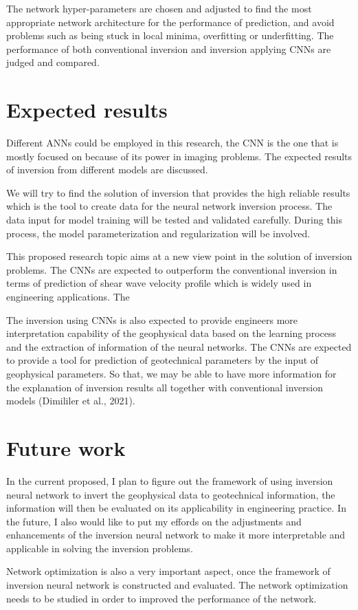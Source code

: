 The network hyper-parameters are chosen and adjusted to find the most appropriate network architecture for the performance of prediction, and avoid problems such as being stuck in local minima, overfitting or underfitting. The performance of both conventional inversion and inversion applying CNNs are judged and compared. 

\section*{Expected results}

Different ANNs could be employed in this research, the CNN is the one that is mostly focused on because of its power in imaging problems. The expected results of inversion from different models are discussed.

We will try to find the solution of inversion that provides the high reliable results which is the tool to create data for the neural network inversion process. The data input for model training will be tested and validated carefully. During this process, the model parameterization and regularization will be involved.

This proposed research topic aims at a new view point in the solution of inversion problems. The CNNs are expected to outperform the conventional inversion in terms of prediction of shear wave velocity profile which is widely used in engineering applications. The  

The inversion using CNNs is also expected to provide engineers more interpretation capability of the geophysical data based on the learning process and the extraction of information of the neural networks. The CNNs are expected to provide a tool for prediction of geotechnical parameters by the input of geophysical parameters. So that, we may be able to have more information for the explanation of inversion results all together with conventional inversion models (Dimililer et al., 2021). 

\section*{Future work}

In the current proposed, I plan to figure out the framework of using inversion neural network to invert the geophysical data to geotechnical information, the information will then be evaluated on its applicability in engineering practice. In the future, I also would like to put my effords on the adjustments and enhancements of the inversion neural network to make it more interpretable and applicable in solving the inversion problems.

Network optimization is also a very important aspect, once the framework of inversion neural network is constructed and evaluated. The network optimization needs to be studied in order to improved the performance of the network.
